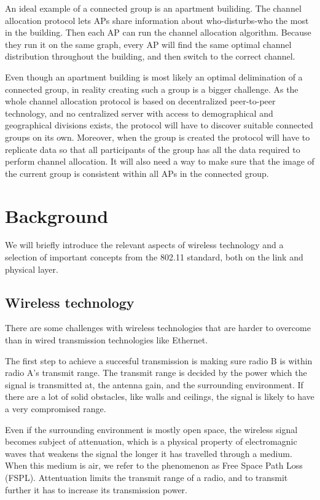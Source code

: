 \documentclass[a4paper,UKenglish]{report}
\begin{document}
An ideal example of a connected group is an apartment builiding. The channel allocation protocol lets APs share information about who-disturbs-who the most in the building.
Then each AP can run the channel allocation algorithm. Because they run it on the same graph, every AP will find the same optimal channel distribution throughout the building,
and then switch to the correct channel. 

Even though an apartment building is most likely an optimal delimination of a connected group, in reality creating such a group is a bigger challenge. As the whole channel allocation
protocol is based on decentralized peer-to-peer technology, and no centralized server with access to demographical and geographical divisions exists, the protocol will
have to discover suitable connected groups on its own. Moreover, when the group is created the protocol will have to replicate data so that
all participants of the group has all the data required to perform channel allocation. It will also need a way to make sure that the image of the current group
is consistent within all APs in the connected group. 

\chapter{Background}
We will briefly introduce the relevant aspects of wireless technology and a selection of important
concepts from the 802.11 standard, both on the link and physical layer.

\section{Wireless technology}
There are some challenges with wireless technologies that are harder to overcome than in wired transmission technologies like Ethernet.

The first step to achieve a succesful transmission is making sure radio B is within radio A's transmit range. The
transmit range is decided by the power which the signal is transmitted at, the antenna gain, and the surrounding 
environment. If there are a lot of solid obstacles, like walls and ceilings, the signal is likely to have a very compromised range.

Even if the surrounding environment is mostly open space, the wireless signal becomes subject of attenuation,
which is a physical property of electromagnic waves that weakens the signal the longer it has travelled through a
medium. When this medium is air, we refer to the phenomenon as Free Space Path Loss (FSPL). Attentuation limits
the transmit range of a radio, and to transmit further it has to increase its transmission power.
\end{document}

